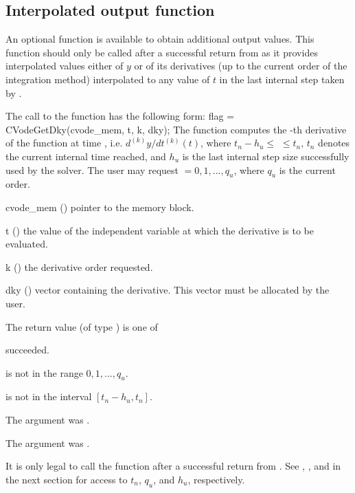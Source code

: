 \subsection{Interpolated output function}\label{ss:optional_dky}

An optional function  is available to obtain additional
output values.  This function should only be called after a successful
return from  as it provides interpolated values either of
$y$ or of its derivatives (up to the current order of the integration
method) interpolated to any value of $t$ in the last internal step
taken by {\cvodes}.

The call to the  function has the following form:
{
  flag = CVodeGetDky(cvode\_mem, t, k, dky);
}
{
  The function  computes the -th derivative of the function
   at time , i.e. $d^{(k)}y/dt^{(k)} (t)$, where $t_n - h_u \le$
   $\le t_n$, $t_n$ denotes the current internal time reached, and $h_u$
  is the  last internal step size successfully used by the solver.  The 
  user may request  $= 0, 1, ..., q_u$, where $q_u$ is the current order. 
}
{
  \begin{args}
  \item[cvode\_mem] ()
    pointer to the {\cvodes} memory block.
  \item[t] ()  the value of the independent variable at
    which the derivative is to be evaluated.
  \item[k] () the derivative order requested.
  \item[dky] ()
    vector containing the derivative.
    This vector must be allocated by the user. 
  \end{args}
}
{
  The return value  (of type ) is one of
  \begin{args} 
  \item[\Id{CV\_SUCCESS}]
     succeeded.
  \item[\Id{CV\_BAD\_K}] 
     is not in the range $0, 1, ..., q_u$.
  \item[\Id{CV\_BAD\_T}] 
     is not in the interval $[t_n - h_u , t_n]$.
  \item[\Id{CV\_BAD\_DKY}] 
    The  argument was .
  \item[\Id{CV\_MEM\_NULL}] 
    The  argument was .
  \end{args}

}
{
  It is only legal to call the function  after a 
  successful return from . See ,
  , and  in the next section for
  access to $t_n$, $q_u$, and $h_u$, respectively.
}

